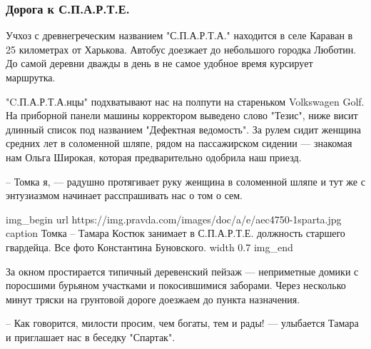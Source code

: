  
 
 

\subsubsection{Дорога к С.П.А.Р.Т.Е.}

Учхоз с древнегреческим названием "С.П.А.Р.Т.А." находится в селе Караван в 25
километрах от Харькова. Автобус доезжает до небольшого городка Люботин. До
самой деревни дважды в день в не самое удобное время курсирует маршрутка.

"C.П.А.Р.Т.А.нцы" подхватывают нас на полпути на стареньком Volkswagen Golf. На
приборной панели машины корректором выведено слово "Тезис", ниже висит длинный
список под названием "Дефектная ведомость". За рулем сидит женщина средних лет
в соломенной шляпе, рядом на пассажирском сидении --- знакомая нам Ольга Широкая,
которая предварительно одобрила наш приезд.

– Томка я, --- радушно протягивает руку женщина в соломенной шляпе и тут же с
энтузиазмом начинает расспрашивать нас о том о сем.

\ifcmt
img_begin 
	url https://img.pravda.com/images/doc/a/e/aec4750-1sparta.jpg
	caption Томка – Тамара Костюк занимает в С.П.А.Р.Т.Е. должность старшего гвардейца.
Все фото Константина Буновского.
	width 0.7
img_end
\fi
  
За окном простирается типичный деревенский пейзаж --- неприметные домики с
поросшими бурьяном участками и покосившимися заборами. Через несколько минут
тряски на грунтовой дороге доезжаем до пункта назначения.

– Как говорится, милости просим, чем богаты, тем и рады! --- улыбается Тамара и
приглашает нас в беседку "Спартак".

